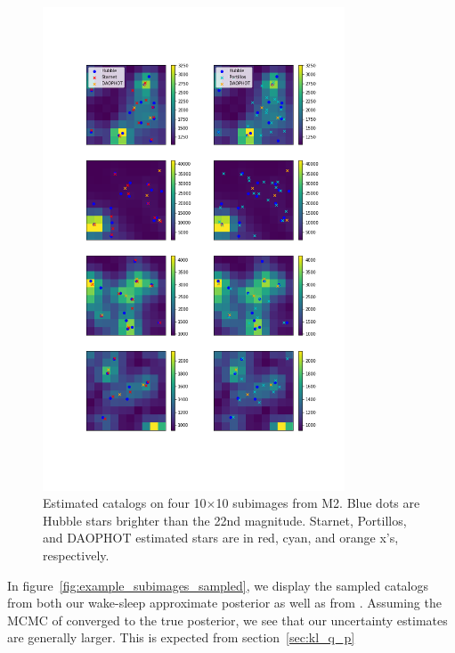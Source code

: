 \begin{figure}[h]
    \centering
    \vspace{-3cm}
    \includegraphics[width=0.8\textwidth]{figures/example_subimages.png}    
    \vspace{-3cm}
    \caption{Estimated catalogs on four 10$\times$10 subimages from 
    M2. Blue dots are Hubble stars brighter than the 22nd magnitude. 
    Starnet, Portillos, and DAOPHOT estimated stars are in 
    red, cyan, and orange x's, respectively. }
    \label{fig:example_subimages}
\end{figure}


In figure~\ref{fig:example_subimages_sampled}, we display the sampled catalogs from both our wake-sleep approximate posterior as well as from \cite{Feder_2019}. Assuming the MCMC 
of \cite{Feder_2019} converged to the true posterior, we see that our uncertainty estimates 
are generally larger. This is expected from section~\ref{sec:kl_q_p}

